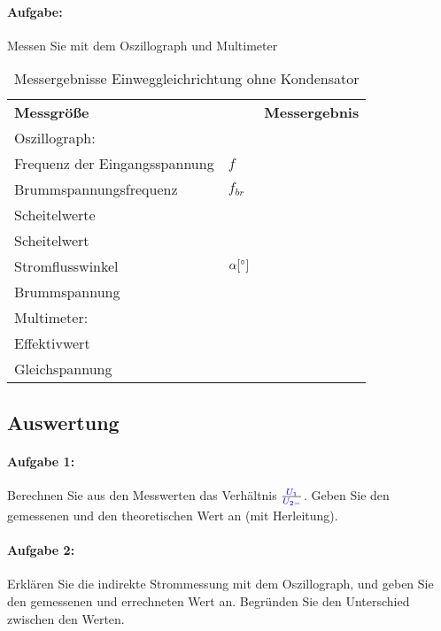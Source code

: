 \documentclass[11pt,a4paper,titlepage,parskip=half]{scrreprt}
\begin{document}
				\paragraph{Aufgabe:} Messen Sie mit dem Oszillograph und Multimeter
					\begin{table}[H]
						\caption{Messergebnisse Einweggleichrichtung ohne Kondensator}
						\label{tbl:messergebnisse1.1}
						\renewcommand{\arraystretch}{1.6}
                        \begin{center}
						\begin{tabular}{ll|l}
							\multicolumn{2}{l}{\textbf{Messgröße}} & \textbf{Messergebnis}\\ 
                            \multicolumn{3}{l}{Oszillograph:}\\\hline
							Frequenz der Eingangsspannung & $f$ & \\\hline
							Brummspannungsfrequenz & $f_{br}$ &\\\hline
							Scheitelwerte & \spannung{$U_{1_{max}}$} &\\\hline
							Scheitelwert & \spannung{$U_{2_{max}}$} &\\\hline
							Stromflusswinkel &  $\alpha [ \degree]$& \\\hline
							Brummspannung &  \spannung{$U_{brmax}$} &\\\hline
                                                        \multicolumn{3}{l}{Multimeter:}\\\hline
							Effektivwert & \spannung{$U_{1}$} &\\\hline
							Gleichspannung & \spannung{$U_{2-}$} & \\
						\end{tabular}
                    \end{center}
					\end{table}
		\subsection{Auswertung}
			\paragraph{Aufgabe 1:} Berechnen Sie aus den Messwerten das Verhältnis $\frac{\textcolor{blue}{U_1}}{\textcolor{blue}{U_{2-}}}$. Geben Sie den gemessenen und den theoretischen Wert an (mit Herleitung).
            
            \paragraph{Aufgabe 2:} Erklären Sie die indirekte Strommessung mit dem Oszillograph, und geben Sie den gemessenen und errechneten Wert an. Begründen Sie den Unterschied zwischen den Werten.
	
\end{document}
